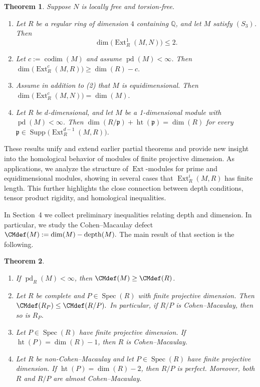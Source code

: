 \documentclass[11.05pt,a4paper]{amsart}
\newtheorem{theorem}{Theorem}[section]
\theoremstyle{definition}
\theoremstyle{remark}
\newcommand{\Spec}{\operatorname{Spec}}
\newcommand{\pd}{\operatorname{pd}}
\newcommand{\Ext}{\operatorname{Ext}}
\newcommand{\Supp}{\operatorname{Supp}}
\newcommand{\depth}{\operatorname{depth}}
\begin{document}
\begin{theorem}\label{3}Suppose  \( N \) is locally free and torsion-free.
	\begin{enumerate}
		\item
		Let \( R \) be a regular ring of dimension \(4\) containing \( \mathbb{Q} \), and let \( M \) satisfy \( (S_3) \).  Then
		\[
		\dim \big(\Ext^{1}_R(M,N)\big) \le 2.
		\]
	
		
		\item
		Let \( c := \operatorname{codim}(M) \) and assume \( \pd(M) < \infty \). Then
		\(
		\dim \big(\Ext^{c}_R(M,R)\big) \ge \dim(R) - c.
		\)
		
		\item
		Assume in addition to {\rm (2)} that \( M \) is equidimensional. Then
		\(\dim\!\big(\Ext^{c}_R(M,N)\big) = \dim(M).\) 
		
		\item
		Let \( R \) be \( d \)-dimensional, and let \( M \) be a 1-dimensional module with \( \pd(M) < \infty \). Then
		\(
		\dim(R/\mathfrak{p}) + \operatorname{ht}(\mathfrak{p}) = \dim(R)
		\)
		for every \( \mathfrak{p} \in \Supp\!\big(\Ext^{d-1}_R(M,R)\big) \).
	\end{enumerate}
\end{theorem}

These results unify and extend earlier partial theorems and provide new insight into the homological behavior of modules of finite projective dimension. As applications, we analyze the structure of \( \Ext \)-modules for prime and equidimensional modules, showing in several cases that \( \Ext^i_R(M,R) \) has finite length. This further highlights the close connection between depth conditions, tensor product rigidity, and homological inequalities.

In Section~4 we collect preliminary inequalities relating depth and dimension. In particular, we study the Cohen--Macaulay defect
\(
\CMdef(M) := \dim(M) - \depth(M).
\)
The main result of that section is the following.

\begin{theorem}\label{1.2}
	\begin{enumerate}
		\item
		If \( \pd_R(M) < \infty \), then \( \CMdef(M) \ge \CMdef(R) \).
		
		\item
		Let \( R \) be complete and \( P \in \Spec(R) \) with finite projective dimension. Then
		\(
		\CMdef(R_P) \le \CMdef(R/P).
		\)
		In particular, if \( R/P \) is Cohen--Macaulay, then so is \( R_P \).
		
		\item
		Let \( P \in \Spec(R) \) have finite projective dimension. If \( \operatorname{ht}(P) = \dim(R)-1 \), then \( R \) is Cohen--Macaulay.
		
		\item
		Let \( R \) be non-Cohen--Macaulay and let \( P \in \Spec(R) \) have finite projective dimension. If \( \operatorname{ht}(P) = \dim(R)-2 \), then \( R/P \) is perfect. Moreover, both \( R \) and \( R/P \) are almost Cohen--Macaulay.
	\end{enumerate}
\end{theorem}
\end{document}
